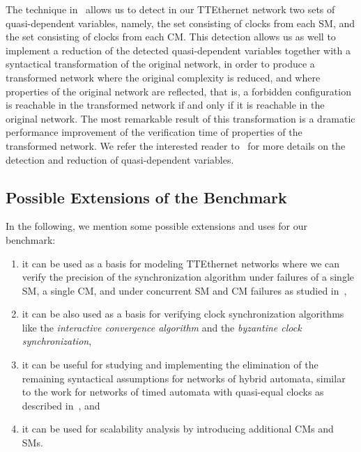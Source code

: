 The technique in~\cite{Herrera3} allows us to detect in our TTEthernet 
network two sets of quasi-dependent variables, namely,
the set consisting of clocks from each SM, and the set consisting of clocks from each CM. 
This detection allows us as well to implement a reduction of 
the detected quasi-dependent variables together with a syntactical transformation of 
the original network, in order to produce a transformed network where the original complexity is reduced,
and where properties of the original network are reflected, that is, a forbidden configuration is reachable in
the transformed network if and only if it is reachable in the original network. The most remarkable result of this 
transformation is a dramatic performance improvement of the verification time of properties of the transformed network. 
We refer the interested reader to~\cite{Herrera3} for more details on the detection and reduction of quasi-dependent
variables. 

\subsection{Possible Extensions of the Benchmark}

In the following, we mention some possible extensions and uses for our benchmark:
\begin{enumerate} 
\item it can be used as a basis for modeling TTEthernet networks where we can verify the
precision of the synchronization algorithm under failures of a single SM, a single CM, and
under concurrent SM and CM failures as studied in~\cite{Steiner2},   
\item it can be also used as a basis for verifying 
clock synchronization algorithms like the \emph{interactive convergence algorithm}\cite{lamport}
and the \emph{byzantine clock synchronization}\cite{lamport},
\item it can be useful for studying
and implementing the elimination of the remaining syntactical assumptions for
networks of hybrid automata, similar to the work for networks of timed automata
with quasi-equal clocks as described in~\cite{Herrera4}, and
\item  it can be used for scalability analysis 
by introducing additional CMs and SMs.
\end{enumerate} 

